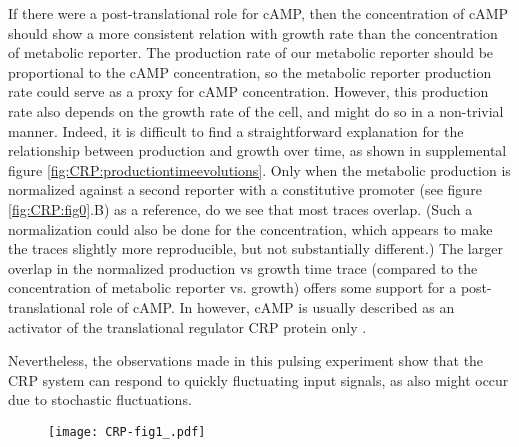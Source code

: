 If there were a post-translational role for cAMP, then the concentration of cAMP should show a more consistent relation with growth rate than the concentration of metabolic reporter.
%
The production rate of our metabolic reporter should be proportional to the cAMP concentration, 
so the metabolic reporter production rate could serve as a proxy for cAMP concentration.
%
However, this production rate also depends on the growth rate of the cell, and might do so in a non-trivial manner.
Indeed, it is difficult to find a straightforward explanation for the relationship between production and growth over time, as shown in supplemental figure \ref{fig:CRP:productiontimeevolutions}.
Only when the metabolic production is normalized against a second reporter with a constitutive promoter (see figure \ref{fig:CRP:fig0}.B) as a reference, do we see that most traces overlap.
%
(Such a normalization could also be done for the concentration, which appears to make the traces slightly more reproducible, but not substantially different.)
%
The larger overlap in the normalized production vs growth time trace (compared to the concentration of metabolic reporter vs. growth) offers some support for a post-translational role of cAMP.
%
In \ecoli however, cAMP is usually described as an activator of the translational regulator CRP protein only \cite{gorke2008, keseler2017}.

Nevertheless, the observations made in this pulsing experiment show that the CRP system can respond to quickly fluctuating input signals, as also might occur due to stochastic fluctuations.

\begin{figure}
	\centering
	\texttt{[image: CRP-fig1\_.pdf]}
	\clearpage %
	\label{fig:CRP:fig1}
\end{figure}	

\clearpage



